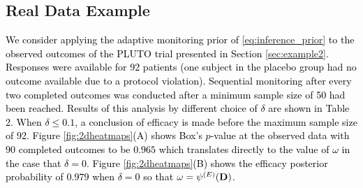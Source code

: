 \documentclass[12pt]{article}
\begin{document}



\subsection{Real Data Example}\label{sec:realdataexample}
\textcolor{black}{
We consider applying the adaptive monitoring prior of \eqref{eq:inference_prior} to the observed outcomes of the PLUTO trial presented in Section \ref{sec:example2}. %
Responses were available for 92 patients (one subject in the placebo group had no outcome available due to a protocol violation). Sequential monitoring after every two completed outcomes was conducted after a minimum sample size of 50 had been reached. Results of this analysis by different choice of $\delta$ are shown in Table 2. When $\delta\leq 0.1$, a conclusion of efficacy is made before the maximum sample size of 92. Figure \ref{fig:2dheatmaps}(A) shows Box's $p$-value at the observed data with $90$ completed outcomes to be $0.965$ which translates directly to the value of $\omega$ in the case that $\delta=0$. Figure \ref{fig:2dheatmaps}(B) shows the efficacy posterior probability of $0.979$ when $\delta=0$ so that $\omega=\psi^{(E)}(\textcolor{black}{\mathbf{D}})$.} 
\end{document}

